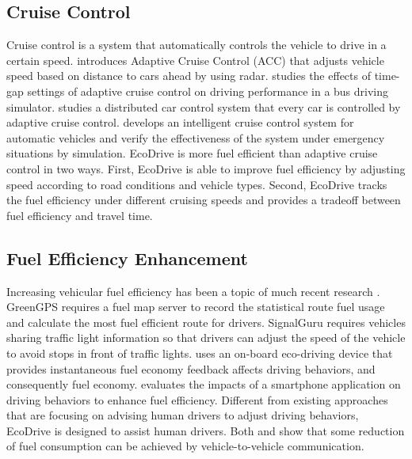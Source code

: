 

\subsection{Cruise Control}

Cruise control \cite{cruise_control} is a system that automatically
controls the vehicle to drive in a certain speed. 
\cite{bengtsson2001adaptive} introduces Adaptive Cruise Control (ACC)
that adjusts vehicle speed based on distance to cars ahead
by using radar. 
\cite{lin2009effects} studies the effects of time-gap
settings of adaptive cruise control on driving performance
in a bus driving simulator. 
\cite{loos2011adaptive} studies a distributed car control system
that every car is controlled by adaptive cruise control. 
\cite{ioannou1993autonomous} develops an intelligent cruise control system 
for automatic vehicles and verify the effectiveness of the system
under emergency situations by simulation.  
EcoDrive is more fuel efficient than adaptive cruise control 
in two ways. 
First, EcoDrive is able to improve fuel efficiency by 
adjusting speed according to road conditions and vehicle types. 
Second, EcoDrive tracks the fuel efficiency under different cruising
speeds and provides a tradeoff between fuel efficiency and travel time. 

\subsection{Fuel Efficiency Enhancement}

Increasing vehicular fuel efficiency has been a topic 
of much recent research \cite{ganti2010greengps, koukoumidis2011signalguru, 
boriboonsomsin2010eco, tulusan2012providing}.
GreenGPS \cite{ganti2010greengps} requires a fuel map server
to record the statistical route fuel usage and calculate the most
fuel efficient route for drivers. 
SignalGuru \cite{koukoumidis2011signalguru} requires vehicles sharing
traffic light information so that drivers can adjust the speed of
the vehicle to avoid stops in front of traffic lights. 
\cite{boriboonsomsin2010eco} uses an on-board eco-driving device 
that provides instantaneous fuel economy
feedback affects driving behaviors, and consequently fuel economy. 
\cite{tulusan2012providing} evaluates the impacts of a smartphone application
on driving behaviors to enhance fuel efficiency. 
Different from existing approaches that are focusing on advising human drivers to adjust driving behaviors, 
EcoDrive is designed to assist human drivers.
Both \cite{lang2013opportunities} and \cite{lang2014prediction} show that some reduction of fuel consumption can be achieved
by vehicle-to-vehicle communication. 



